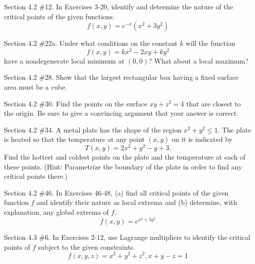 \documentclass[12pt,letterpaper]{hmcpset}
\begin{document}
\newpage

\begin{problem}
Section 4.2 \#12. In Exercises 3-20, identify and determine the nature of the critical points of the given functions.\\
$$ f(x, y) = e^{-x} (x^2 + 3y^2) $$
\end{problem}

\newpage

\begin{problem}
Section 4.2 \#22a. Under what conditions on the constant $k$ will the function
$$ f(x, y) = kx^2 - 2xy + ky^2 $$
have a nondegenerate local minimum at $(0, 0)$? What about a local maximum?
\end{problem}

\newpage

\begin{problem}
Section 4.2 \#28. Show that the largest rectangular box having a fixed surface area must be a cube.
\end{problem}

\newpage

\begin{problem}
Section 4.2 \#30. Find the points on the surface $xy + z^2 = 4$ that are closest to the origin. Be sure to give a convincing argument that your answer is correct.
\end{problem}

\newpage

\begin{problem}
Section 4.2 \#34. A metal plate has the shape of the region $x^2 + y^2 \leq 1$. The plate is heated so that the temperature at any point $(x, y)$ on it is indicated by
$$ T(x, y) = 2x^2 + y^2 - y + 3. $$
Find the hottest and coldest points on the plate and the temperature at each of these points. (Hint: Parametrize the boundary of the plate in order to find any critical points there.)
\end{problem}

\newpage

\begin{problem}
Section 4.2 \#46. In Exercises 46-48, (a) find all critical points of the given function $f$ and identify their nature as local extrema and (b) determine, with explanation, any global extrema of $f$.\\
$$ f(x, y) = e^{x^2 + 5y^2} $$
\end{problem}

\newpage

\begin{problem}
Section 4.3 \#6. In Exercises 2-12, use Lagrange multipliers to identify the critical points of $f$ subject to the given constraints.\\
$$ f(x, y, z) = x^2 + y^2 + z^2, x + y - z = 1 $$
\end{problem}
\end{document}
